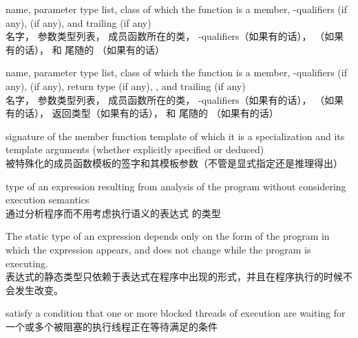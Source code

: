 %
name,
parameter type list,
class of which the function is a member,
\cv-qualifiers (if any),
 (if any),
and
trailing  (if any) \\
名字，
参数类型列表，
成员函数所在的类，
\cv-qualifiers（如果有的话），
（如果有的话），
和
尾随的 （如果有的话）

%
name,
parameter type list,
class of which the function is a member,
\cv-qualifiers (if any),
 (if any),
return type (if any),
,
and
trailing  (if any) \\
名字，
参数类型列表，
成员函数所在的类，
\cv-qualifiers（如果有的话），
（如果有的话），
返回类型（如果有的话），
和
尾随的 （如果有的话）

%
 signature of the member function template
of which it is a specialization and its template arguments (whether explicitly specified or deduced) \\
被特殊化的成员函数模板的签字和其模板参数（不管是显式指定还是推理得出）

%
type of an expression resulting from
analysis of the program without considering execution semantics \\
通过分析程序而不用考虑执行语义的表达式 的类型

\begin{defnote}
The static type of an expression depends only on the form of the program in
which the expression appears, and does not change while the program is 
executing. \\
表达式的静态类型只依赖于表达式在程序中出现的形式，并且在程序执行的时候不会发生改变。
\end{defnote}

%
satisfy a condition that one or more blocked threads of execution are waiting for \\
一个或多个被阻塞的执行线程正在等待满足的条件


